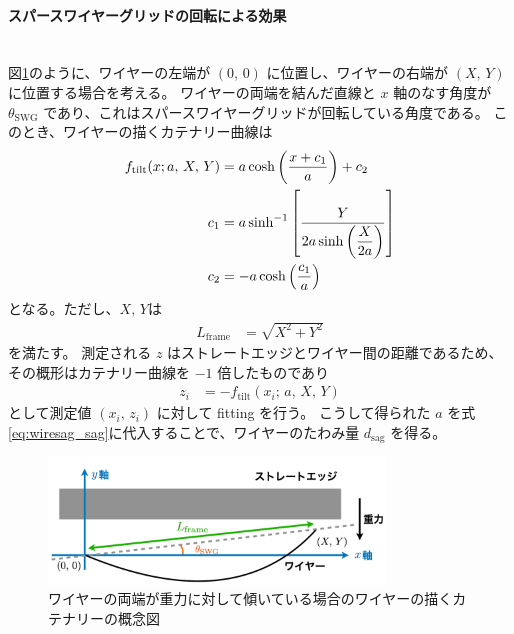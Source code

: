 \documentclass[../../main.tex]{subfiles}
\begin{document}
\paragraph{スパースワイヤーグリッドの回転による効果}\quad\\
\indent
図\ref{fig:wiresag_concept_tilt}のように、ワイヤーの左端が $(0,\,0)$ に位置し、ワイヤーの右端が $(X,\,Y)$ に位置する場合を考える。
ワイヤーの両端を結んだ直線と $x$ 軸のなす角度が $\theta_{\mathrm{SWG}}$ であり、これはスパースワイヤーグリッドが回転している角度である。
このとき、ワイヤーの描くカテナリー曲線は
\begin{align}
    \label{eq:wiresag_catenary_tilt}
    f_{\mathrm{tilt}}(x;a,\,X,\,Y) &= a\cosh\qty(\dfrac{x+c_1}{a}) + c_2 \\
    c_1 &= a\sinh^{-1}\qty[\dfrac{Y}{2a\sinh\qty(\dfrac{X}{2a})}] \\
    c_2 &= -a\cosh\qty(\dfrac{c_1}{a})
\end{align}
となる。ただし、$X,\,Y$は
\begin{align}
    L_{\mathrm{frame}} &= \sqrt{X^2+Y^2}
\end{align}
を満たす。
測定される $z$ はストレートエッジとワイヤー間の距離であるため、その概形はカテナリー曲線を $-1$ 倍したものであり
\begin{align}
    z_{i} &= -f_{\mathrm{tilt}}(x_{i};\,a,\,X,\,Y)
\end{align}
として測定値 $(x_{i},\,z_{i})$ に対して fitting を行う。
こうして得られた $a$ を式\eqref{eq:wiresag_sag}に代入することで、ワイヤーのたわみ量 $d_{\mathrm{sag}}$ を得る。
\begin{figure}[H]
    \centering
    \includegraphics[width=0.8\textwidth]{wiresag/wire_catenary_tilt.pdf}
    \caption{ワイヤーの両端が重力に対して傾いている場合のワイヤーの描くカテナリーの概念図}
    \label{fig:wiresag_concept_tilt}
\end{figure}
\end{document}
